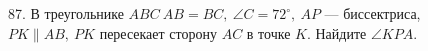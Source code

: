 87. В треугольнике $ABC\ AB=BC,\ \angle C=72^\circ,\ AP$ --- биссектриса, $PK\parallel AB,\ PK$ пересекает сторону $AC$ в точке $K.$ Найдите $\angle KPA.$\\
